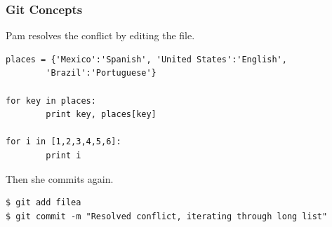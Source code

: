 \begin{frame}[fragile]\frametitle{Git Concepts}
    Pam resolves the conflict by editing the file.

    \vspace{0.5cm}
    \newbox{\mybox}
    \begin{lrbox}{\mybox}
    \begin{minipage}{\linewidth}
    \begin{lstlisting}[basicstyle=\tiny\ttfamily\color{white}]
places = {'Mexico':'Spanish', 'United States':'English',
        'Brazil':'Portuguese'}

for key in places:
        print key, places[key]

for i in [1,2,3,4,5,6]:
        print i
    \end{lstlisting}
    \end{minipage}
    \end{lrbox}
    \colorbox{black}{\usebox{\mybox}}

    \vspace{0.5cm}
    Then she commits again.

    \vspace{0.5cm}
    \newbox{\mybox}
    \begin{lrbox}{\mybox}
    \begin{minipage}{\linewidth}
    \begin{lstlisting}[basicstyle=\tiny\ttfamily\color{white}]
$ git add filea
$ git commit -m "Resolved conflict, iterating through long list"
    \end{lstlisting}
    \end{minipage}
    \end{lrbox}
    \colorbox{black}{\usebox{\mybox}}
\end{frame}

